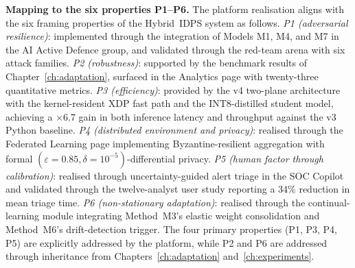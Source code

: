 \noindent\textbf{Mapping to the six properties P1--P6.} The platform realisation aligns with the six framing properties of the Hybrid~IDPS system as follows. \emph{P1 (adversarial resilience)}: implemented through the integration of Models M1, M4, and M7 in the AI Active Defence group, and validated through the red-team arena with six attack families. \emph{P2 (robustness)}: supported by the benchmark results of Chapter~\ref{ch:adaptation}, surfaced in the Analytics page with twenty-three quantitative metrics. \emph{P3 (efficiency)}: provided by the v4 two-plane architecture with the kernel-resident XDP fast path and the INT8-distilled student model, achieving a $\times$6.7 gain in both inference latency and throughput against the v3 Python baseline. \emph{P4 (distributed environment and privacy)}: realised through the Federated Learning page implementing Byzantine-resilient aggregation with formal $(\varepsilon{=}0.85,\delta{=}10^{-5})$-differential privacy. \emph{P5 (human factor through calibration)}: realised through uncertainty-guided alert triage in the SOC Copilot and validated through the twelve-analyst user study reporting a 34\% reduction in mean triage time. \emph{P6 (non-stationary adaptation)}: realised through the continual-learning module integrating Method~M3's elastic weight consolidation and Method~M6's drift-detection trigger. The four primary properties (P1, P3, P4, P5) are explicitly addressed by the platform, while P2 and P6 are addressed through inheritance from Chapters~\ref{ch:adaptation} and~\ref{ch:experiments}.